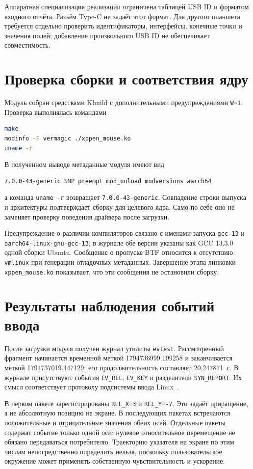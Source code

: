 Аппаратная специализация реализации ограничена таблицей USB ID и форматом входного отчёта. Разъём Type-C не задаёт этот формат. Для другого планшета требуется отдельно проверить идентификаторы, интерфейсы, конечные точки и значения полей; добавление произвольного USB ID не обеспечивает совместимость.

\section{Проверка сборки и соответствия ядру}

Модуль собран средствами Kbuild с дополнительными предупреждениями \texttt{W=1}. Проверка выполнялась командами
\begin{lstlisting}[language=bash,basicstyle=\small\ttfamily]
make
modinfo -F vermagic ./xppen_mouse.ko
uname -r
\end{lstlisting}
В полученном выводе метаданные модуля имеют вид
\begin{lstlisting}[basicstyle=\footnotesize\ttfamily]
7.0.0-43-generic SMP preempt mod_unload modversions aarch64
\end{lstlisting}
а команда \texttt{uname -r} возвращает \texttt{7.0.0-43-generic}. Совпадение строки выпуска и архитектуры подтверждает сборку для целевого ядра. Само по себе оно не заменяет проверку поведения драйвера после загрузки.

Предупреждение о различии компиляторов связано с именами запуска \texttt{gcc-13} и \texttt{aarch64-linux-gnu-gcc-13}; в журнале обе версии указаны как GCC 13.3.0 одной сборки Ubuntu. Сообщение о пропуске BTF относится к отсутствию \texttt{vmlinux} при генерации отладочных метаданных. Завершение этапа линковки \texttt{xppen\_mouse.ko} показывает, что эти сообщения не остановили сборку.

\section{Результаты наблюдения событий ввода}

После загрузки модуля получен журнал утилиты \texttt{evtest}. Рассмотренный фрагмент начинается временной меткой 1794736999.199258 и заканчивается меткой 1794737019.447129; его продолжительность составляет 20,247871~с. В журнале присутствуют события \texttt{EV\_REL}, \texttt{EV\_KEY} и разделители \texttt{SYN\_REPORT}. Их смысл соответствует протоколу подсистемы ввода Linux~\cite{eventcodes}.

В первом пакете зарегистрированы \texttt{REL\_X=3} и \texttt{REL\_Y=-7}. Это задаёт приращение, а не абсолютную позицию на экране. В последующих пакетах встречаются положительные и отрицательные значения обеих осей. Отдельные пакеты содержат событие только одной оси: нулевое относительное перемещение не обязано передаваться потребителю. Траекторию указателя на экране по этим числам непосредственно определить нельзя, поскольку пользовательское окружение может применять собственную чувствительность и ускорение.

